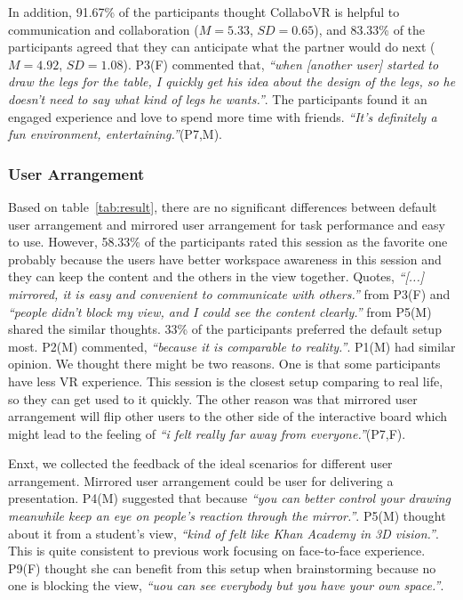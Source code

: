 \documentclass{sigchi}
\begin{document}
In addition, 91.67\% of the participants thought CollaboVR is helpful to communication and collaboration ($M=5.33$, $SD=0.65$), and 83.33\% of the participants agreed that they can anticipate what the partner would do next ($M=4.92$, $SD=1.08$). P3(F) commented that, \textit{``when [another user] started to draw the legs for the table, I quickly get his idea about the design of the legs, so he doesn't need to say what kind of legs he wants.''}. The participants found it an engaged experience and love to spend more time with friends. \textit{``It's definitely a fun environment, entertaining.''}(P7,M).

\subsubsection{User Arrangement}
Based on table~\ref{tab:result}, there are no significant differences between default user arrangement and mirrored user arrangement for task performance and easy to use. However, 58.33\% of the participants rated this session as the favorite one probably because the users have better workspace awareness in this session and they can keep the content and the others in the view together. Quotes, \textit{``[...] mirrored, it is easy and convenient to communicate with others.''} from P3(F) and \textit{``people didn't block my view, and I could see the content clearly.''} from P5(M) shared the similar thoughts. 33\% of the participants preferred the default setup most. P2(M) commented, \textit{``because it is comparable to reality.''}. P1(M) had similar opinion. We thought there might be two reasons. One is that some participants have less VR experience. This session is the closest setup comparing to real life, so they can get used to it quickly. The other reason was that mirrored user arrangement will flip other users to the other side of the interactive board which might lead to the feeling of \textit{``i felt really far away from everyone.''}(P7,F).

Enxt, we collected the feedback of the ideal scenarios for different user arrangement. Mirrored user arrangement could be user for delivering a presentation. P4(M) suggested that because \textit{``you can better control your drawing meanwhile keep an eye on people's reaction through the mirror.''}. P5(M) thought about it from a student's view, \textit{``kind of felt like Khan Academy in 3D vision.''}. This is quite consistent to previous work focusing on face-to-face experience. P9(F) thought she can benefit from this setup when brainstorming because no one is blocking the view, \textit{``uou can see everybody but you have your own space.''}.
\end{document}
